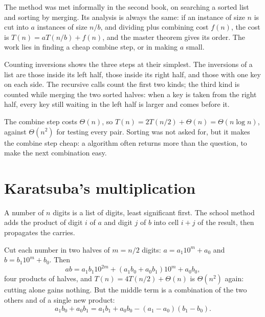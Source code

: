 The method was met informally in the second book, on searching a sorted list and sorting by merging. Its analysis is
always the same: if an instance of size $n$ is cut into $a$ instances of size $n/b$, and dividing plus combining cost
$f(n)$, the cost is $T(n) = aT(n/b) + f(n)$, and the master theorem gives its order. The work lies in finding a cheap
combine step, or in making $a$ small.

Counting inversions shows the three steps at their simplest. The inversions of a list are those inside its left half,
those inside its right half, and those with one key on each side. The recursive calls count the first two kinds; the
third kind is counted while merging the two sorted halves: when a key is taken from the right half, every key still
waiting in the left half is larger and comes before it.

\label{lst:b1:divide-and-conquer:inversions}

\label{out:b1:divide-and-conquer:inversions}

The combine step costs $\Theta(n)$, so $T(n) = 2T(n/2) + \Theta(n) = \Theta(n \log n)$, against $\Theta(n^2)$ for
testing every pair. Sorting was not asked for, but it makes the combine step cheap: a  algorithm
often returns more than the question, to make the next combination easy.

\section{Karatsuba's multiplication}\label{sec:b1:divide-and-conquer:karatsuba}

A number of $n$ digits is a list of digits, least significant first. The school method adds the product of digit $i$
of $a$ and digit $j$ of $b$ into cell $i + j$ of the result, then propagates the carries.

\label{lst:b1:divide-and-conquer:school}

Cut each number in two halves of $m = n/2$ digits: $a = a_1 10^m + a_0$ and $b = b_1 10^m + b_0$. Then
\[ ab = a_1 b_1 10^{2m} + (a_1 b_0 + a_0 b_1) 10^m + a_0 b_0, \]
four products of halves, and $T(n) = 4T(n/2) + \Theta(n)$ is $\Theta(n^2)$ again: cutting alone gains nothing. But
the middle term is a combination of the two others and of a single new product:
\[ a_1 b_0 + a_0 b_1 = a_1 b_1 + a_0 b_0 - (a_1 - a_0)(b_1 - b_0). \]

